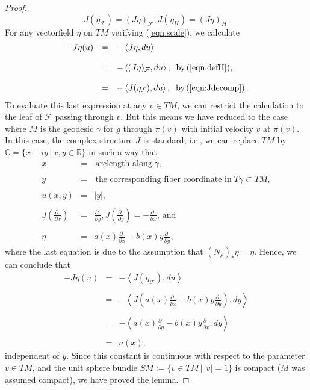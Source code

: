 \documentclass[12pt,reqno]{amsart}\usepackage{amssymb,amsmath,amscd,epsfig,amsthm,enumerate,import,eufrak}
\theoremstyle{definition}
\theoremstyle{remark}
\numberwithin{equation}{section}
\theoremstyle{plain}
\theoremstyle{definition}
\def \r {\mathbb{R}}
\def \c {\mathbb{C}}
\def \vs {\vskip 2mm}
\theoremstyle{remark}
\numberwithin{theorem}{section}
\begin{document}
\begin{proof}
%
\begin{equation} 
	\label{eqn:Jdecomp}
		J(\eta_{\mathcal{F}}) = (J \eta)_{\mathcal{F}}; J(\eta_H) = (J \eta)_H.
\end{equation}  
\vs
For any vectorfield $\eta$ on $TM$ verifying (\ref{eqn:scale}), we calculate
%
\[
\begin{array}{rcl}
	- J \eta (u) & = & - \left< J \eta, du \right> \\
		&	&	\\
		& = & - \left< (J \eta)_{\mathcal{F}}, du \right>, \;\;\text{by} \, (\ref{eqn:defH}), \\
		&	&	\\
		& = & - \left<J (\eta_{\mathcal{F}}), du\right>, \;\; \text{by} \, (\ref{eqn:Jdecomp}).
\end{array}
\]
%
To evaluate this last expression at any $v \in TM$, we can restrict the calculation to the leaf of $\mathcal{F}$ passing through $v$. But this means we have reduced to the case where $M$ is the geodesic $\gamma$ for $g$ through $\pi(v)$ with initial velocity $v$ at $\pi(v)$. In this case, the complex structure $J$ is standard, i.e., we can replace $TM$ by $\c = \{ x + iy \, | \, x, y \in \r\}$ in such a way that 
%
\[
\begin{array}{rcl}
	x & = & \, \text{arclength along} \; \gamma, \\
	&	&	\\
	y & = & \, \text{the corresponding fiber coordinate in} \; T\gamma \subset TM, \\
	&	&	\\
	u(x,y) & = & |y|,\\
	&	&	\\
	J(\frac{\partial \,\,}{\partial x}) & = & \frac{\partial \,\,}{\partial y}, J(\frac{\partial \,\,}{\partial y}) = - \frac{\partial \,\,}{\partial x}, \, \text{and} \\
	&	&	\\ 
	 \eta & = & a(x) \frac{\partial \,\,}{\partial x} + b(x) y \frac{\partial \,\,}{\partial y},
\end{array}
\]
%
\vs
%
where the last equation is due to the assumption that $(N_{\rho})_* \eta = \eta.$ Hence, we can conclude that
%
\[
\begin{array}{rcl}
- J \eta (u) & = & - \left<J (\eta_{\mathcal{F}}), du\right> \\
&	&	\\
& = & - \left< J(a(x) \frac{\partial \,\,}{\partial x} + b(x) y \frac{\partial \,\,}{\partial y}), dy\right> \\
& &	\\
& = & - \left< a(x) \frac{\partial \,\,}{\partial y} - b(x) y \frac{\partial\,\,}{\partial x}, dy \right> \\
&	&	\\
& = & a(x),
\end{array}
\]
%
independent of $y$. Since this constant is continuous with respect to the parameter $v \in TM$, and the unit sphere bundle $SM := \{ v \in TM \, | \, |v| = 1\}$ is compact ($M$ was assumed compact), we have proved the lemma.
\end{proof}
%
%
%
%
%
\fi
%
%
%
%
%
%
\vs
\end{document}
